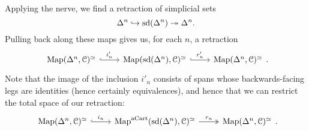 \documentclass[main.tex]{subfiles}
\begin{document}
\begin{example}
  Applying the nerve, we find a retraction of simplicial sets
  \begin{equation*}
    \Delta^{n} \hookrightarrow \mathrm{sd}(\Delta^{n}) \twoheadrightarrow \Delta^{n}.
  \end{equation*}
  Pulling back along these maps gives us, for each $n$, a retraction
  \begin{equation*}
    \begin{tikzcd}
      \Map(\Delta^{n}, \category{C})^{\simeq}
      \arrow[r, hook, "i'_{n}"]
      & \Map(\sd(\Delta^{n}), \category{C})^{\simeq} 
      \arrow[r, hook, "r'_{n}"]
      & \Map(\Delta^{n}, \category{C})^{\simeq}
    \end{tikzcd}.
  \end{equation*}
  Note that the image of the inclusion $i'_{n}$ consists of spans whose backwards-facing legs are identities (hence certainly equivalences), and hence that we can restrict the total space of our retraction:
  \begin{equation*}
    \begin{tikzcd}
      \Map(\Delta^{n}, \category{C})^{\simeq} 
      \arrow[r, hook, "i_{n}"]
      & \Map^{\aCart}(\sd(\Delta^{n}), \category{C})^{\simeq}
      \arrow[r, two heads, "r_{n}"]
      & \Map(\Delta^{n}, \category{C})^{\simeq}
    \end{tikzcd}.
  \end{equation*}


\end{example}
\end{document}
